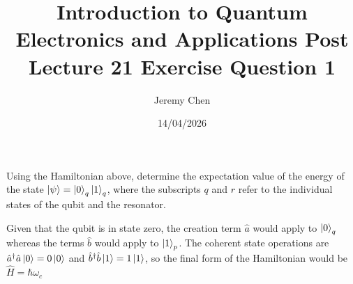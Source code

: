 \documentclass[10pt,letterpaper]{article}
\title{Introduction to Quantum Electronics and Applications Post Lecture 21 Exercise Question 1}
\author{Jeremy Chen}
\date{14/04/2026}
\begin{document}
	\maketitle

\noindent Using the Hamiltonian above, determine the expectation value of the energy of the state $\ket{\psi} = \ket{0}_{q}\ket{1}_{q}$, where the subscripts $q$ and $r$ refer to the individual states of the qubit and the resonator. 

\color{violet}
Given that the qubit is in state zero, the creation term $\hat{a}$ would apply to $\ket{0}_{q}$ whereas the terms $\hat{b}$ would apply to $\ket{1}_{p}$. The coherent state operations are $\hat{a}^{\dagger}\hat{a}\ket{0} = 0\ket{0}$ and $\hat{b}^{\dagger}\hat{b}\ket{1} = 1\ket{1}$, so the final form of the Hamiltonian would be $\hat{H} = \hbar\omega_{c}$
\color{black}
\end{document}
